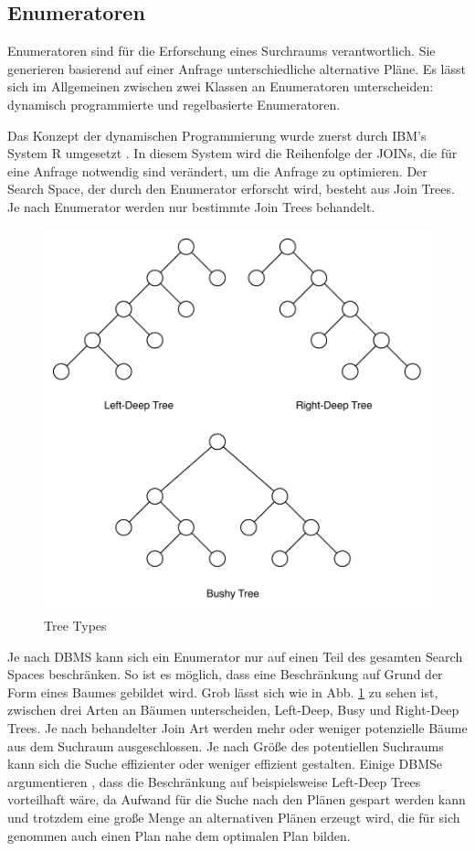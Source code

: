 \subsection{Enumeratoren}



Enumeratoren sind für die Erforschung eines Surchraums verantwortlich. Sie generieren basierend auf einer Anfrage unterschiedliche alternative Pläne. Es lässt sich im Allgemeinen zwischen zwei Klassen an Enumeratoren unterscheiden: dynamisch programmierte und regelbasierte Enumeratoren.  

Das Konzept der dynamischen Programmierung wurde zuerst durch IBM's System R umgesetzt \cite{selinger1979access}. In diesem System wird die Reihenfolge der JOINs, die für eine Anfrage notwendig sind verändert, um die Anfrage zu optimieren. Der Search Space, der durch den Enumerator erforscht wird, besteht aus Join Trees. Je nach Enumerator werden nur bestimmte Join Trees behandelt.


\begin{figure}[h]
  \centering
  \includegraphics[width=\textwidth]{02_Grundlagen/TreeTypes.pdf}
  \caption{Tree Types}
  \label{TreeTypes}
\end{figure}

Je nach \ac{DBMS} kann sich ein Enumerator nur auf einen Teil des gesamten Search Spaces beschränken. So ist es möglich, dass eine Beschränkung auf Grund der Form eines Baumes gebildet wird. Grob lässt sich wie in Abb. \ref{TreeTypes} zu sehen ist, zwischen drei Arten an Bäumen unterscheiden, Left-Deep, Busy und Right-Deep Trees. Je nach behandelter Join Art werden mehr oder weniger potenzielle Bäume aus dem Suchraum ausgeschlossen. Je nach Größe des potentiellen Suchraums kann sich die Suche effizienter oder weniger effizient gestalten. Einige \ac{DBMS}e argumentieren , dass die Beschränkung auf beispielsweise Left-Deep Trees vorteilhaft wäre, da Aufwand für die Suche nach den Plänen gespart werden kann und trotzdem eine große Menge an alternativen Plänen erzeugt wird, die für sich genommen auch einen Plan nahe dem optimalen Plan bilden. 